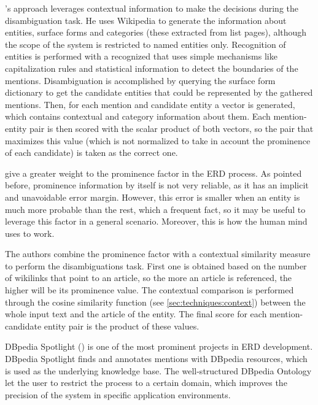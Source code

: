 \cite{cucerzan2007}'s approach leverages contextual information to make the decisions during the disambiguation task. He uses Wikipedia to generate the information about entities, surface forms and categories (these extracted from list pages), although the scope of the system is restricted to named entities only. Recognition of entities is performed with a recognized that uses simple mechanisms like capitalization rules and statistical information to detect the boundaries of the mentions. Disambiguation is accomplished by querying the surface form dictionary to get the candidate entities that could be represented by the gathered mentions. Then, for each mention and candidate entity a vector is generated, which contains contextual and category information about them. Each mention-entity pair is then scored with the scalar product of both vectors, so the pair that maximizes this value (which is not normalized to take in account the prominence of each candidate) is taken as the correct one.

\medskip

\cite{fader2009} give a greater weight to the prominence factor in the ERD process. As pointed before, prominence information by itself is not very reliable, as it has an implicit and unavoidable error margin. However, this error is smaller when an entity is much more probable than the rest, which a frequent fact, so it may be useful to leverage this factor in a general scenario. Moreover, this is how the human mind uses to work.

The authors combine the prominence factor with a contextual similarity measure to perform the disambiguations task. First one is obtained based on the number of wikilinks that point to an article, so the more an article is referenced, the higher will be its prominence value. The contextual comparison is performed through the cosine similarity function (see \autoref{sec:techniques:context}) between the whole input text and the article of the entity. The final score for each mention-candidate entity pair is the product of these values.

\medskip

DBpedia Spotlight (\cite{mendes2011}) is one of the most prominent projects in ERD development. DBpedia Spotlight finds and annotates mentions with DBpedia resources, which is used as the underlying knowledge base. The well-structured DBpedia Ontology let the user to restrict the process to a certain domain, which improves the precision of the system in specific application environments.

